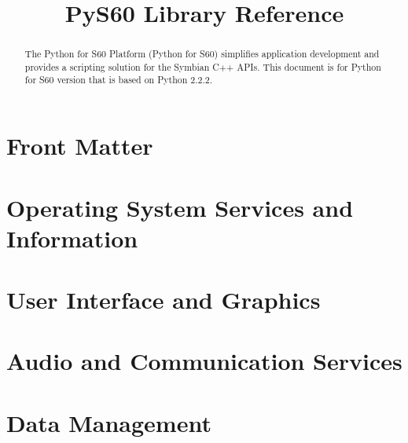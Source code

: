 \documentclass{manual}
\title{PyS60 Library Reference}
\begin{document}
\maketitle

\ifhtml
\chapter*{Front Matter\label{front}}
\fi



\begin{abstract}

\noindent

The Python for S60 Platform (Python for S60) simplifies application development 
and provides a scripting solution for the Symbian C++ APIs. This document is for 
Python for S60 version \productversion that is based on Python 2.2.2.

\end{abstract}

\tableofcontents





\chapter{Operating System Services and Information \label{s60os}}




\chapter{User Interface and Graphics \label{s60graph}}





\chapter{Audio and Communication Services \label{s60ac}}







\chapter{Data Management \label{s60data}}
\end{document}
